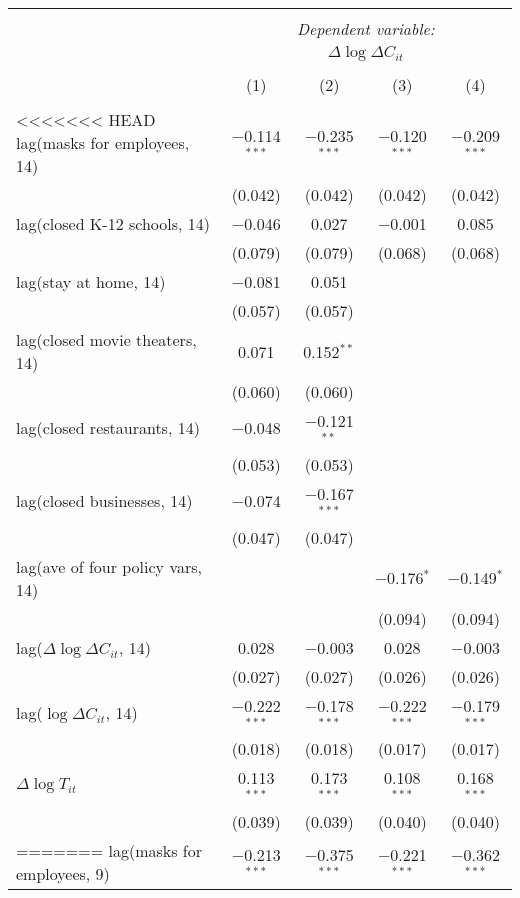 \begin{tabular}{@{\extracolsep{1pt}}lcccc} 
\\[-1.8ex]\hline 
\hline \\[-1.8ex] 
 & \multicolumn{4}{c}{\textit{Dependent variable:}} \\ 
\cline{2-5} 
 & \multicolumn{4}{c}{$\Delta \log \Delta C_{it}$} \\ 
\\[-1.8ex] & (1) & (2) & (3) & (4)\\ 
\hline \\[-1.8ex] 
<<<<<<< HEAD
 lag(masks for employees, 14) & $-$0.114$^{***}$ & $-$0.235$^{***}$ & $-$0.120$^{***}$ & $-$0.209$^{***}$ \\ 
  & (0.042) & (0.042) & (0.042) & (0.042) \\ 
  lag(closed K-12 schools, 14) & $-$0.046 & 0.027 & $-$0.001 & 0.085 \\ 
  & (0.079) & (0.079) & (0.068) & (0.068) \\ 
  lag(stay at home, 14) & $-$0.081 & 0.051 &  &  \\ 
  & (0.057) & (0.057) &  &  \\ 
  lag(closed movie theaters, 14) & 0.071 & 0.152$^{**}$ &  &  \\ 
  & (0.060) & (0.060) &  &  \\ 
  lag(closed restaurants, 14) & $-$0.048 & $-$0.121$^{**}$ &  &  \\ 
  & (0.053) & (0.053) &  &  \\ 
  lag(closed businesses, 14) & $-$0.074 & $-$0.167$^{***}$ &  &  \\ 
  & (0.047) & (0.047) &  &  \\ 
  lag(ave of four policy vars, 14) &  &  & $-$0.176$^{*}$ & $-$0.149$^{*}$ \\ 
  &  &  & (0.094) & (0.094) \\ 
  lag($\Delta \log \Delta C_{it}$, 14) & 0.028 & $-$0.003 & 0.028 & $-$0.003 \\ 
  & (0.027) & (0.027) & (0.026) & (0.026) \\ 
  lag($\log \Delta C_{it}$, 14) & $-$0.222$^{***}$ & $-$0.178$^{***}$ & $-$0.222$^{***}$ & $-$0.179$^{***}$ \\ 
  & (0.018) & (0.018) & (0.017) & (0.017) \\ 
  $\Delta \log T_{it}$ & 0.113$^{***}$ & 0.173$^{***}$ & 0.108$^{***}$ & 0.168$^{***}$ \\ 
  & (0.039) & (0.039) & (0.040) & (0.040) \\ 
=======
 lag(masks for employees, 9) & $-$0.213$^{***}$ & $-$0.375$^{***}$ & $-$0.221$^{***}$ & $-$0.362$^{***}$ \\ 

\end{tabular}
